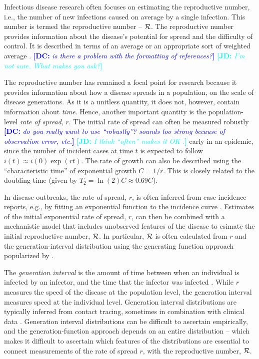 \documentclass[12pt]{article}
\newcommand{\RR}{\ensuremath{{\cal R}}}
\newcommand{\Tc}{\ensuremath{C}}
\newcommand{\comment}[3]{\textcolor{#1}{\textbf{[#2: }\textit{#3}\textbf{]}}}
\newcommand{\jd}[1]{\comment{cyan}{JD}{#1}}
\newcommand{\dc}[1]{\comment{blue}{DC}{#1}}
\begin{document}
Infectious disease research often focuses on estimating the reproductive number, i.e., the number of new infections caused on average by a single infection.
This number is termed the reproductive number -- \RR.
The reproductive number provides information about the disease's potential for spread and the difficulty of control.
It is described in terms of an average \cite{AndeMay91} or an appropriate sort of weighted average \cite{DiekHees90}.
\dc{is there a problem with the formatting of references?}
\jd{I'm not sure. What makes you ask?}

The reproductive number has remained a focal point for research because it provides information about how a disease spreads in a population, on the scale of disease generations.
As it is a unitless quantity, it does not, however, contain information about \emph{time}.
Hence, another important quantity is the population-level \emph{rate of spread}, $r$. The initial rate of spread can often be measured robustly \dc{do you really want to use ``robustly''? sounds too strong because of observation error, etc.}
\jd{I think ``often'' makes it OK .}
early in an epidemic, since the number of incident cases at time $t$ is expected to follow $i(t) \approx i(0) \exp(r t)$. The rate of growth can also be described using the ``characteristic time'' of exponential growth $\Tc = 1/r$. This is closely related to the doubling time (given by $T_2 = \ln(2) \Tc \approx 0.69 \Tc$).

In disease outbreaks, the rate of spread, $r$, is often inferred from case-incidence reports, e.g., by fitting an exponential function to the incidence curve \cite{MillRobi04, NishCast09, MaJDush14}.
Estimates of the initial exponential rate of spread, $r$, can then be combined with a mechanistic model that includes unobserved features of the disease to esimate the initial reproductive number, \RR.
In particular, $\RR$ is often calculated from $r$ and the generation-interval distribution using the generating function approach popularized by \cite{WallLips07}.

The \emph{generation interval} is the amount of time between when an individual is infected by an infector, and the time that the infector was infected \cite{Sven07}.
While $r$ measures the speed of the disease at the population level, the generation interval measures speed at the individual level.
Generation interval distributions are typically inferred from contact tracing, sometimes in combination with clinical data \cite{AylwBarb14,LessOtt16,HubeJohn16}.
Generation interval distributions can be difficult to ascertain empirically, and the generation-function approach depends on an entire distribution -- which makes it difficult to ascertain which features of the distributions are essential to connect measurements of the rate of spread $r$, with the reproductive number, \RR.
\end{document}
